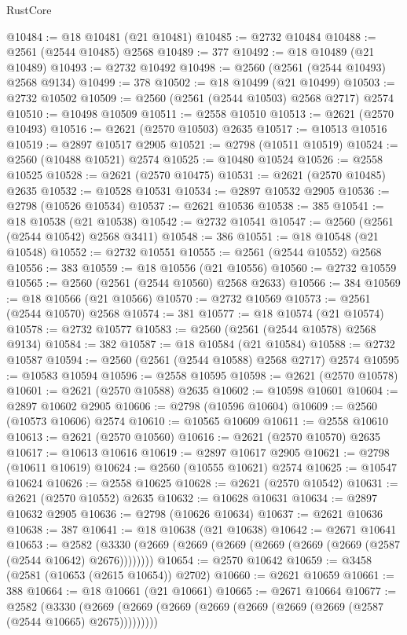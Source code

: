 \begin{lexlean}{RustCore}
\begin{coremodule}
@10484 := @18 @10481 (@21 @10481)
@10485 := @2732 @10484
@10488 := @2561 (@2544 @10485) @2568
@10489 := 377
@10492 := @18 @10489 (@21 @10489)
@10493 := @2732 @10492
@10498 := @2560 (@2561 (@2544 @10493) @2568 @9134)
@10499 := 378
@10502 := @18 @10499 (@21 @10499)
@10503 := @2732 @10502
@10509 := @2560 (@2561 (@2544 @10503) @2568 @2717) @2574
@10510 := @10498 @10509
@10511 := @2558 @10510
@10513 := @2621 (@2570 @10493)
@10516 := @2621 (@2570 @10503) @2635
@10517 := @10513 @10516
@10519 := @2897 @10517 @2905
@10521 := @2798 (@10511 @10519)
@10524 := @2560 (@10488 @10521) @2574
@10525 := @10480 @10524
@10526 := @2558 @10525
@10528 := @2621 (@2570 @10475)
@10531 := @2621 (@2570 @10485) @2635
@10532 := @10528 @10531
@10534 := @2897 @10532 @2905
@10536 := @2798 (@10526 @10534)
@10537 := @2621 @10536
@10538 := 385
@10541 := @18 @10538 (@21 @10538)
@10542 := @2732 @10541
@10547 := @2560 (@2561 (@2544 @10542) @2568 @3411)
@10548 := 386
@10551 := @18 @10548 (@21 @10548)
@10552 := @2732 @10551
@10555 := @2561 (@2544 @10552) @2568
@10556 := 383
@10559 := @18 @10556 (@21 @10556)
@10560 := @2732 @10559
@10565 := @2560 (@2561 (@2544 @10560) @2568 @2633)
@10566 := 384
@10569 := @18 @10566 (@21 @10566)
@10570 := @2732 @10569
@10573 := @2561 (@2544 @10570) @2568
@10574 := 381
@10577 := @18 @10574 (@21 @10574)
@10578 := @2732 @10577
@10583 := @2560 (@2561 (@2544 @10578) @2568 @9134)
@10584 := 382
@10587 := @18 @10584 (@21 @10584)
@10588 := @2732 @10587
@10594 := @2560 (@2561 (@2544 @10588) @2568 @2717) @2574
@10595 := @10583 @10594
@10596 := @2558 @10595
@10598 := @2621 (@2570 @10578)
@10601 := @2621 (@2570 @10588) @2635
@10602 := @10598 @10601
@10604 := @2897 @10602 @2905
@10606 := @2798 (@10596 @10604)
@10609 := @2560 (@10573 @10606) @2574
@10610 := @10565 @10609
@10611 := @2558 @10610
@10613 := @2621 (@2570 @10560)
@10616 := @2621 (@2570 @10570) @2635
@10617 := @10613 @10616
@10619 := @2897 @10617 @2905
@10621 := @2798 (@10611 @10619)
@10624 := @2560 (@10555 @10621) @2574
@10625 := @10547 @10624
@10626 := @2558 @10625
@10628 := @2621 (@2570 @10542)
@10631 := @2621 (@2570 @10552) @2635
@10632 := @10628 @10631
@10634 := @2897 @10632 @2905
@10636 := @2798 (@10626 @10634)
@10637 := @2621 @10636
@10638 := 387
@10641 := @18 @10638 (@21 @10638)
@10642 := @2671 @10641
@10653 := @2582 (@3330 (@2669 (@2669 (@2669 (@2669 (@2669 (@2669 (@2587 (@2544 @10642) @2676))))))))
@10654 := @2570 @10642
@10659 := @3458 (@2581 (@10653 (@2615 @10654)) @2702)
@10660 := @2621 @10659
@10661 := 388
@10664 := @18 @10661 (@21 @10661)
@10665 := @2671 @10664
@10677 := @2582
    (@3330 (@2669 (@2669 (@2669 (@2669 (@2669 (@2669 (@2669 (@2587 (@2544 @10665) @2675)))))))))

\end{coremodule}
\end{lexlean}
